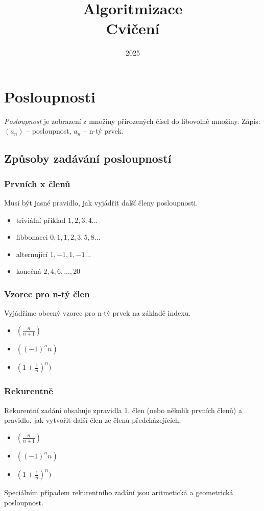\documentclass[12pt,a4paper]{book}
\title{\Huge \textbf{Algoritmizace}\\[0.5cm] \Large Cvičení}
\author{}
\date{2025}
\begin{document}
\maketitle
\tableofcontents

\chapter{Posloupnosti}
\begin{definition}
\emph{Posloupnost} je zobrazení z množiny přirozených čísel do libovolné množiny.
Zápis: $(a_n)$ -- posloupnost, $a_n$ -- n-tý prvek.
\end{definition}

\section{Způsoby zadávání posloupností} 
	\subsection{Prvních x členů}
		Musí být jasné pravidlo, jak vyjádřit další členy posloupnosti.
		\begin{example}
			\begin{itemize}
				\item triviální příklad $1, 2, 3, 4 ... $
				\item fibbonacci $0, 1, 1, 2, 3, 5, 8 ...$
				\item alternující $1, -1, 1, -1 ...$
				\item konečná $2, 4, 6, ..., 20$
			\end{itemize}
		\end{example}
	\subsection{Vzorec pro n-tý člen}
		Vyjádříme obecný vzorec pro n-tý prvek na základě indexu.
		\begin{example}
			\begin{itemize}
				\item $(\frac{n}{n+1})$
				\item $((-1)^nn)$
				\item $ (1 + \frac{1}{n})^n)$
			\end{itemize}
		\end{example}
	
	\subsection{Rekurentně} 
		Rekurentní zadání obsahuje zpravidla 1. člen (nebo několik prvních členů) a pravidlo, jak vytvořit další člen ze členů předcházejících.
		\begin{example}
			\begin{itemize}
				\item $(\frac{n}{n+1})$
				\item $((-1)^nn)$
				\item $ (1 + \frac{1}{n})^n)$
			\end{itemize}
		\end{example}
Speciálním případem rekurentního zadání jsou aritmetická a geometrická posloupnost.
\end{document}
